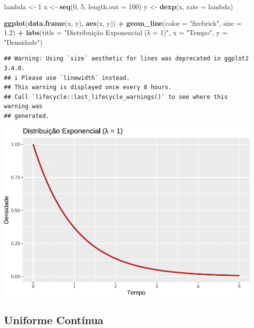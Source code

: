 \documentclass[
]{book}
\newenvironment{Shaded}{\begin{snugshade}}{\end{snugshade}}
\newcommand{\AttributeTok}[1]{\textcolor[rgb]{0.13,0.29,0.53}{#1}}
\newcommand{\DecValTok}[1]{\textcolor[rgb]{0.00,0.00,0.81}{#1}}
\newcommand{\FloatTok}[1]{\textcolor[rgb]{0.00,0.00,0.81}{#1}}
\newcommand{\FunctionTok}[1]{\textcolor[rgb]{0.13,0.29,0.53}{\textbf{#1}}}
\newcommand{\NormalTok}[1]{#1}
\newcommand{\OtherTok}[1]{\textcolor[rgb]{0.56,0.35,0.01}{#1}}
\newcommand{\SpecialCharTok}[1]{\textcolor[rgb]{0.81,0.36,0.00}{\textbf{#1}}}
\newcommand{\StringTok}[1]{\textcolor[rgb]{0.31,0.60,0.02}{#1}}
\begin{document}
\begin{Shaded}
\begin{Highlighting}[]
\NormalTok{lambda }\OtherTok{\textless{}{-}} \DecValTok{1}
\NormalTok{x }\OtherTok{\textless{}{-}} \FunctionTok{seq}\NormalTok{(}\DecValTok{0}\NormalTok{, }\DecValTok{5}\NormalTok{, }\AttributeTok{length.out =} \DecValTok{100}\NormalTok{)}
\NormalTok{y }\OtherTok{\textless{}{-}} \FunctionTok{dexp}\NormalTok{(x, }\AttributeTok{rate =}\NormalTok{ lambda)}

\FunctionTok{ggplot}\NormalTok{(}\FunctionTok{data.frame}\NormalTok{(x, y), }\FunctionTok{aes}\NormalTok{(x, y)) }\SpecialCharTok{+}
  \FunctionTok{geom\_line}\NormalTok{(}\AttributeTok{color =} \StringTok{"firebrick"}\NormalTok{, }\AttributeTok{size =} \FloatTok{1.2}\NormalTok{) }\SpecialCharTok{+}
  \FunctionTok{labs}\NormalTok{(}\AttributeTok{title =} \StringTok{"Distribuição Exponencial (λ = 1)"}\NormalTok{, }\AttributeTok{x =} \StringTok{"Tempo"}\NormalTok{, }\AttributeTok{y =} \StringTok{"Densidade"}\NormalTok{)}
\end{Highlighting}
\end{Shaded}

\begin{verbatim}
## Warning: Using `size` aesthetic for lines was deprecated in ggplot2 3.4.0.
## i Please use `linewidth` instead.
## This warning is displayed once every 8 hours.
## Call `lifecycle::last_lifecycle_warnings()` to see where this warning was
## generated.
\end{verbatim}

\includegraphics{Livro-Estatistica+R_files/figure-latex/exponencial-1.pdf}

\subsection{Uniforme Contínua}\label{uniforme-contuxednua}
\end{document}
